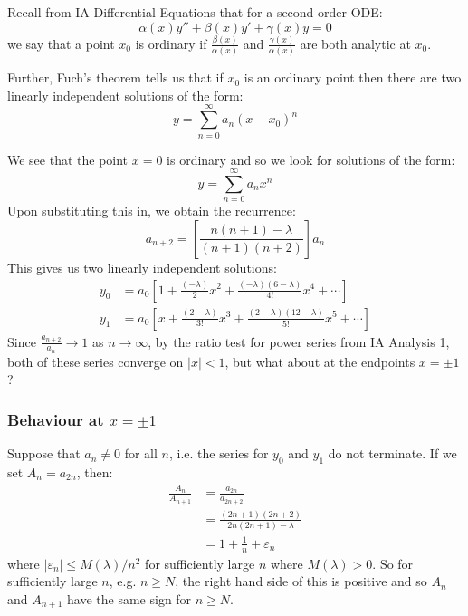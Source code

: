 \documentclass[../main.tex]{subfiles}
\begin{document}
\begin{remark}[Recap]
  Recall from IA Differential Equations that for a second order ODE:
  \[
    \alpha(x) y'' + \beta(x) y' + \gamma(x) y = 0
  \]
  we say that a point $x_0$ is ordinary if $\frac{\beta(x)}{\alpha(x)}$ and $\frac{\gamma(x)}{\alpha(x)}$ are both analytic at $x_0$.

  Further, Fuch's theorem tells us that if $x_0$ is an ordinary point then there are two linearly independent solutions of the form:
  \[
    y = \sum_{n = 0}^{\infty} a_n (x - x_0)^n
  \]
\end{remark}
We see that the point $x = 0$ is ordinary and so we look for solutions of the form:
\[
  y = \sum_{n = 0}^{\infty} a_n x^n
\]
Upon substituting this in, we obtain the recurrence:
\[
  a_{n + 2} = \left[\frac{n(n + 1) - \lambda}{(n + 1)(n + 2)}\right] a_n
\]
This gives us two linearly independent solutions:
\begin{align*}
  y_0 &= a_0\left[1 + \frac{(-\lambda)}{2}x^2 + \frac{(-\lambda)(6 - \lambda)}{4!}x^4 + \cdots\right] \\
  y_1 &= a_0\left[x + \frac{(2 - \lambda)}{3!}x^3 + \frac{(2 - \lambda)(12 - \lambda)}{5!}x^5 + \cdots\right]
\end{align*}
Since $\frac{a_{n + 2}}{a_n} \to 1$ as $n \to \infty$, by the ratio test for power series from IA Analysis 1, both of these series converge on $|x| < 1$, but what about at the endpoints $x = \pm 1$?
\subsubsection{Behaviour at $x = \pm 1$}
\nonexaminable
Suppose that $a_n \neq 0$ for all $n$, i.e. the series for $y_0$ and $y_1$ do not terminate.
If we set $A_n = a_{2n}$, then:
\begin{align*}
  \frac{A_n}{A_{n + 1}} &= \frac{a_{2n}}{a_{2n + 2}} \\
                        &= \frac{(2n + 1)(2n + 2)}{2n(2n + 1) - \lambda} \\
                        &= 1 + \frac{1}{n} + \varepsilon_n
\end{align*}
where $|\varepsilon_n| \leq M(\lambda)/n^2$ for sufficiently large $n$ where $M(\lambda) > 0$.
So for sufficiently large $n$, e.g. $n \geq N$, the right hand side of this is positive and so $A_n$ and $A_{n + 1}$ have the same sign for $n \geq N$.
\end{document}

